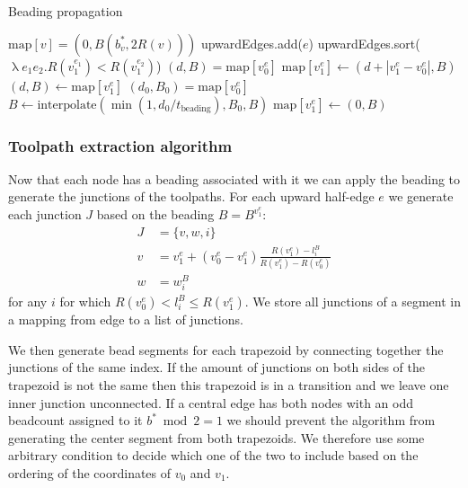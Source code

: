 \begin{algorithm}
\caption{Beading propagation}
\label{alg_beading_propagation}
\begin{algorithmic}
	 $\text{map}[v] = (0, B(b^*_v, 2 R(v)))$ \EndIf
\EndFor
{}
		upwardEdges.add($e$)
	\EndIf
\EndFor
\State upwardEdges.sort($\uplambda e_1 e_2 . R(v_1^{e_1}) < R(v_1^{e_2})$) 
 
    		\State $(d, B) = \text{map}[v_0^e]$
    		\State $\text{map}[v_1^e] \leftarrow (d + |v_1^e - v_0^e|, B)$
	\EndIf
\EndFor
{} 
    		\State $(d, B) \leftarrow \text{map}[v_1^e]$
    			\State $(d_0, B_0) = \text{map}[v_0^e]$
    			\State $B \leftarrow \text{interpolate}(\min(1, d_0 /  t_\text{beading}), B_0, B)$
    		\EndIf
    		\State $\text{map}[v_1^e] \leftarrow (0, B)$
	\EndIf
\EndFor
\end{algorithmic}
\end{algorithm}




\subsubsection{Toolpath extraction algorithm}
Now that each node has a beading associated with it we can apply the beading to generate the junctions of the toolpaths.
For each upward half-edge $e$ we generate each junction $J$ based on the beading $B = B^{v_1^e}$:
\begin{align*}
J &= \{ v, w, i \} \\ 
v &= v_1^e + (v_0^e - v_1^e) \frac{R(v_1^e) - l_i^B}{R(v_1^e) - R(v_0^e)} \\ 
w &= w_i^B
\end{align*}
for any $i$ for which $R(v_0^e) < l_i^B \leq R(v_1^e)$.
We store all junctions of a segment in a mapping from edge to a list of junctions.

We then generate bead segments for each trapezoid by connecting together the junctions of the same index.
If the amount of junctions on both sides of the trapezoid is not the same then this trapezoid is in a transition and we leave one inner junction unconnected.
If a central edge has both nodes with an odd beadcount assigned to it $b^* \bmod 2 = 1 $ we should prevent the algorithm from generating the center segment from both trapezoids.
We therefore use some arbitrary condition to decide which one of the two to include based on the ordering of the coordinates of $v_0$ and $v_1$.

